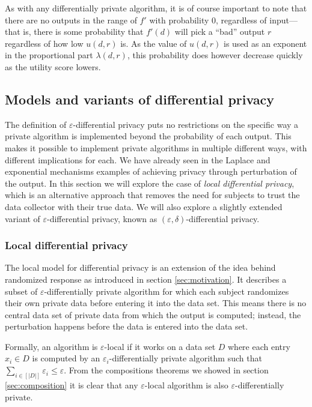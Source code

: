 \documentclass[a4paper,12pt]{article}
\renewcommand{\epsilon}{\varepsilon}
\begin{document}
As with any differentially private algorithm, it is of course important to note that there are no outputs in the range of $f'$ with probability 0, regardless of input---that is, there is some probability that $f'(d)$ will pick a ``bad'' output $r$ regardless of how low $u(d, r)$ is. As the value of $u(d,r)$ is used as an exponent in the proportional part $\lambda(d,r)$, this probability does however decrease quickly as the utility score lowers.

\subsection{Models and variants of differential privacy \label{sec:variants}}

The definition of $\epsilon$-differential privacy puts no restrictions on the specific way a private algorithm is implemented beyond the probability of each output. This makes it possible to implement private algorithms in multiple different ways, with different implications for each. We have already seen in the Laplace and exponential mechanisms examples of achieving privacy through perturbation of the output. In this section we will explore the case of \emph{local differential privacy}, which is an alternative approach that removes the need for subjects to trust the data collector with their true data. We will also explore a slightly extended variant of $\epsilon$-differential privacy, known as $(\epsilon,\delta)$-differential privacy.

\subsubsection{Local differential privacy}

The local model for differential privacy \cite{kasiv_localdiff} is an extension of the idea behind randomized response as introduced in section \ref{sec:motivation}. It describes a subset of $\epsilon$-differentially private algorithm for which each subject randomizes their own private data before entering it into the data set. This means there is no central data set of private data from which the output is computed; instead, the perturbation happens before the data is entered into the data set.

Formally, an algorithm is $\epsilon$-local if it works on a data set $D$ where each entry $x_i \in D$ is computed by an $\epsilon_i$-differentially private algorithm such that $\sum_{i\in\left[|D|\right]} \epsilon_i \leq \epsilon$. From the compositions theorems we showed in section \ref{sec:composition} it is clear that any $\epsilon$-local algorithm is also $\epsilon$-differentially private.
\end{document}
